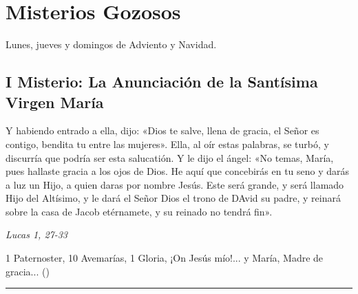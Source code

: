 \documentclass[./rosary.tex]{subfiles}
\begin{document}
\section*{Misterios Gozosos}
Lunes, jueves y domingos de Adviento y Navidad.

\subsection*{I Misterio: La Anunciación de la Santísima Virgen María}
Y habiendo entrado a ella, dijo: «Dios te salve, llena de gracia, el Señor es contigo, bendita tu entre las mujeres».
Ella, al oír estas palabras, se turbó, y discurría que podría ser esta salucatión. Y le dijo el ángel: «No temas, María,
pues hallaste gracia a los ojos de Dios. He aquí que concebirás en tu seno y darás a luz un Hijo, a quien daras por
nombre Jesús. Este será grande, y será llamado Hijo del Altísimo, y le dará el Señor Dios el trono de DAvid su padre,
y reinará sobre la casa de Jacob etérnamete, y su reinado no tendrá fin».

\begin{flushright}
    \emph{Lucas 1, 27-33}
\end{flushright}

1 Paternoster, 10 Avemarías, 1 Gloria, ¡On Jesús mío!... y María, Madre de gracia... ()

\rule{\textwidth}{0.5pt}
\end{document}
